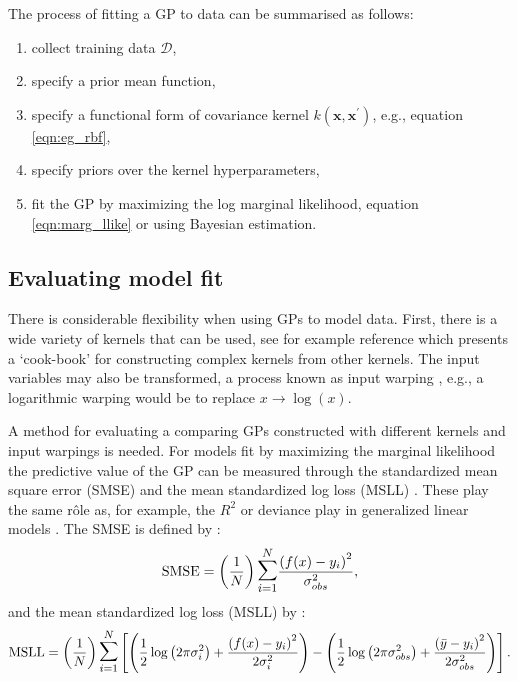 The process of fitting a GP to data can be summarised as follows:
\begin{enumerate}
    \item collect training data $\mathcal{D}$, 
    \item specify a prior mean function, 
    \item  specify a functional form of covariance kernel $k(\mathbf{x}, \mathbf{x}^{\prime})$, e.g., equation \ref{eqn:eg_rbf}, 
    \item specify priors over the kernel hyperparameters, 
    \item fit the GP by maximizing the log marginal likelihood, equation \ref{eqn:marg_llike} or using Bayesian estimation. 
\end{enumerate}

\subsection{Evaluating model fit}\label{subsec:gp_fit}

There is considerable flexibility when using GPs to model data. First, there is a wide variety of kernels that can be used, see for example reference \cite{duvenaudAutomaticModelConstruction2014} which presents a `cook-book' for constructing complex kernels from other kernels. The input variables may also be transformed, a process known as input warping \cite{snoekInputWarpingBayesian2014a}, e.g., a logarithmic warping would be to replace $x \rightarrow \log{(x)}$. 

A method for evaluating a comparing GPs constructed with different kernels and input warpings is needed. For models fit by maximizing the marginal likelihood the predictive value of the GP can be measured through the standardized mean square error (SMSE) and the mean standardized log loss (MSLL) \cite{rasmussenGaussianProcessesMachine2006}. These play the same r\^ole as, for example, the $R^2$ or deviance play in generalized linear models \cite{dobson2018introduction}. The SMSE is defined by \cite{rasmussenGaussianProcessesMachine2006}:
\begin{equation}\label{eqn:smse}
\mathrm{SMSE} =\left(\frac{1}{N}\right) \mathlarger{\mathlarger{\sum}}_{i=1}^{N} \frac{\left(f(x)-y_{i}\right)^{2}}{\sigma_{obs}^{2}},
\end{equation}
and the mean standardized log loss (MSLL) by \cite{rasmussenGaussianProcessesMachine2006}:
\begin{equation}\label{eqn:msll}
\mathrm{MSLL}=\left(\frac{1}{N}\right) \mathlarger{\mathlarger{\sum}}_{i=1}^{N}\left[\left(\frac{1}{2} \log \left(2 \pi \sigma_{i}^{2}\right)+\frac{\left(f(x)-y_{i}\right)^{2}}{2\sigma_{i}^{2}}\right)-\left(\frac{1}{2} \log \left(2 \pi \sigma_{obs}^{2}\right)+\frac{\left(\bar{y}-y_{i}\right)^{2}}{2\sigma_{obs}^{2}}\right)\right].
\end{equation}  

